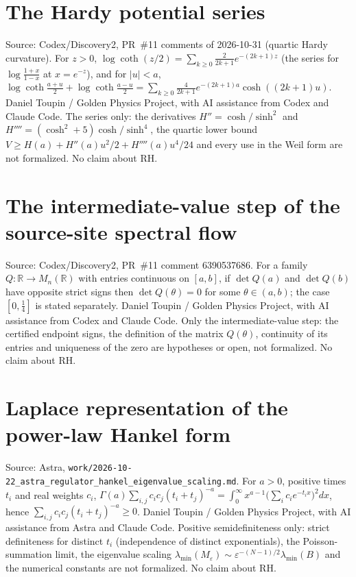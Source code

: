 \documentclass{report}
\theoremstyle{definition}
\begin{document}
\begin{itemize}
\begin{itemize}
\section{The Hardy potential series}
Source: Codex/Discovery2, PR~\#11 comments of 2026-10-31 (quartic Hardy curvature). For $z>0$, $\log\coth(z/2)=\sum_{k\ge0}\frac{2}{2k+1}e^{-(2k+1)z}$ (the series for $\log\frac{1+x}{1-x}$ at $x=e^{-z}$), and for $|u|<a$, $\log\coth\frac{a+u}2+\log\coth\frac{a-u}2=\sum_{k\ge0}\frac{4}{2k+1}e^{-(2k+1)a}\cosh((2k+1)u)$.
Daniel Toupin / Golden Physics Project, with AI assistance from Codex and Claude Code. The series only: the derivatives $H''=\cosh/\sinh^2$ and $H''''=(\cosh^2+5)\cosh/\sinh^4$, the quartic lower bound $V\ge H(a)+H''(a)u^2/2+H''''(a)u^4/24$ and every use in the Weil form are not formalized. No claim about RH.

\section{The intermediate-value step of the source-site spectral flow}
Source: Codex/Discovery2, PR~\#11 comment 6390537686. For a family $Q:\mathbb R\to M_n(\mathbb R)$ with entries continuous on $[a,b]$, if $\det Q(a)$ and $\det Q(b)$ have opposite strict signs then $\det Q(\theta)=0$ for some $\theta\in(a,b)$; the case $[0,\tfrac14]$ is stated separately.
Daniel Toupin / Golden Physics Project, with AI assistance from Codex and Claude Code. Only the intermediate-value step: the certified endpoint signs, the definition of the matrix $Q(\theta)$, continuity of its entries and uniqueness of the zero are hypotheses or open, not formalized. No claim about RH.

\section{Laplace representation of the power-law Hankel form}
Source: Astra, \texttt{work/2026-10-22\_astra\_regulator\_hankel\_eigenvalue\_scaling.md}. For $a>0$, positive times $t_i$ and real weights $c_i$,
$\Gamma(a)\sum_{i,j}c_ic_j(t_i+t_j)^{-a}=\int_0^\infty x^{a-1}\bigl(\sum_ic_ie^{-t_ix}\bigr)^2dx$, hence $\sum_{i,j}c_ic_j(t_i+t_j)^{-a}\ge0$.
Daniel Toupin / Golden Physics Project, with AI assistance from Astra and Claude Code. Positive semidefiniteness only: strict definiteness for distinct $t_i$ (independence of distinct exponentials), the Poisson-summation limit, the eigenvalue scaling $\lambda_{\min}(M_\varepsilon)\sim\varepsilon^{-(N-1)/2}\lambda_{\min}(B)$ and the numerical constants are not formalized. No claim about RH.


\end{itemize}
\end{itemize}
\end{document}
